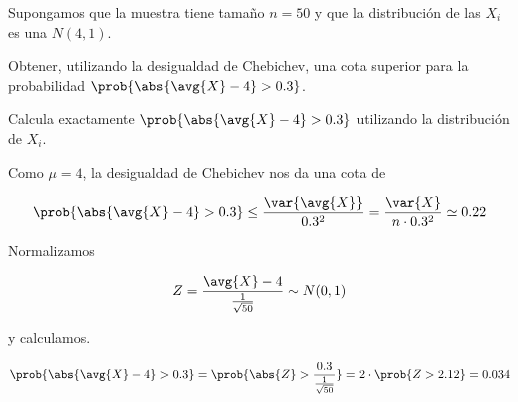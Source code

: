 \begin{problem}[2] Supongamos que la muestra tiene tamaño $n=50$ y que la distribución de las $X_i$ es una $N(4,1)$. 

\ppart Obtener, utilizando la desigualdad de Chebichev, una cota superior para la probabilidad $\prob{\abs{\avg{X} - 4} > 0.3}$.

\ppart Calcula exactamente $\prob{\abs{\avg{X} - 4} > 0.3}$ utilizando la distribución de $X_i$. 

\solution
\spart

Como $\mu = 4$, la desigualdad de Chebichev nos da una cota de 

\[
\prob{\abs{\avg{X} - 4} > 0.3} \leq
\frac{\var{\avg{X}}}{0.3^2} =
\frac{\var{X}}{n \cdot 0.3^2} \simeq 0.22
\]

\spart

Normalizamos

\[ Z = \frac{\avg{X} - 4}{\frac{1}{\sqrt{50}}} \sim N(0,1) \]

y calculamos.

\[ \prob{\abs{\avg{X} - 4} > 0.3} = \prob{\abs{Z} > \frac{0.3}{\frac{1}{\sqrt{50}}}} = 2 \cdot \prob{Z > 2.12} = 0.034 \]

\end{problem}


